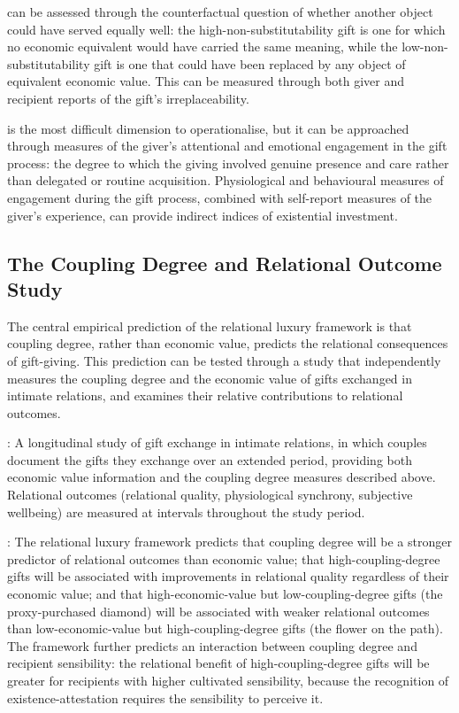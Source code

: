  can be assessed through the counterfactual question of whether another object could have served equally well: the high-non-substitutability gift is one for which no economic equivalent would have carried the same meaning, while the low-non-substitutability gift is one that could have been replaced by any object of equivalent economic value. This can be measured through both giver and recipient reports of the gift's irreplaceability.

 is the most difficult dimension to operationalise, but it can be approached through measures of the giver's attentional and emotional engagement in the gift process: the degree to which the giving involved genuine presence and care rather than delegated or routine acquisition. Physiological and behavioural measures of engagement during the gift process, combined with self-report measures of the giver's experience, can provide indirect indices of existential investment.

\subsection{The Coupling Degree and Relational Outcome Study}
\label{p16:subsec:outcome_study}

\noindent
The central empirical prediction of the relational luxury framework is that coupling degree, rather than economic value, predicts the relational consequences of gift-giving. This prediction can be tested through a study that independently measures the coupling degree and the economic value of gifts exchanged in intimate relations, and examines their relative contributions to relational outcomes.

: A longitudinal study of gift exchange in intimate relations, in which couples document the gifts they exchange over an extended period, providing both economic value information and the coupling degree measures described above. Relational outcomes (relational quality, physiological synchrony, subjective wellbeing) are measured at intervals throughout the study period.

: The relational luxury framework predicts that coupling degree will be a stronger predictor of relational outcomes than economic value; that high-coupling-degree gifts will be associated with improvements in relational quality regardless of their economic value; and that high-economic-value but low-coupling-degree gifts (the proxy-purchased diamond) will be associated with weaker relational outcomes than low-economic-value but high-coupling-degree gifts (the flower on the path). The framework further predicts an interaction between coupling degree and recipient sensibility: the relational benefit of high-coupling-degree gifts will be greater for recipients with higher cultivated sensibility, because the recognition of existence-attestation requires the sensibility to perceive it.

